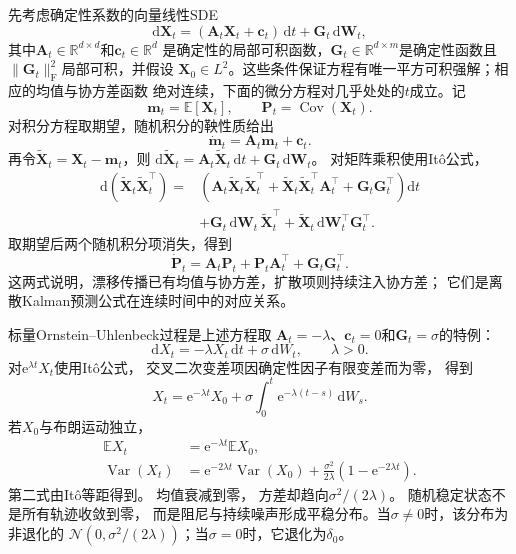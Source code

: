 先考虑确定性系数的向量线性SDE
\[
	\mathrm d\bm X_t
	=(\bm A_t\bm X_t+\bm c_t)\,\mathrm dt
	+\bm G_t\,\mathrm d\bm W_t,
\]
其中$\bm A_t\in\mathbb{R}^{d\times d}$和$\bm c_t\in\mathbb{R}^d$
是确定性的局部可积函数，$\bm G_t\in\mathbb{R}^{d\times m}$是确定性函数且
$\lVert\bm G_t\rVert_{\mathrm F}^2$局部可积，并假设
$\bm X_0\in L^2$。这些条件保证方程有唯一平方可积强解；相应的均值与协方差函数
绝对连续，下面的微分方程对几乎处处的$t$成立。记
\[
	\bm m_t=\mathbb{E}[\bm X_t],\qquad
	\bm P_t=\operatorname{Cov}(\bm X_t).
\]
对积分方程取期望，随机积分的鞅性质给出
\begin{equation}
	\dot{\bm m}_t=\bm A_t\bm m_t+\bm c_t.
	\label{eq:dynamical-linear-sde-mean}
\end{equation}
再令$\widetilde{\bm X}_t=\bm X_t-\bm m_t$，则
$\mathrm d\widetilde{\bm X}_t
=\bm A_t\widetilde{\bm X}_t\,\mathrm dt+\bm G_t\,\mathrm d\bm W_t$。
对矩阵乘积使用Itô公式，
\[
	\begin{aligned}
	\mathrm d(\widetilde{\bm X}_t\widetilde{\bm X}_t^\top)
	={}&
	\left(
	\bm A_t\widetilde{\bm X}_t\widetilde{\bm X}_t^\top
	+\widetilde{\bm X}_t\widetilde{\bm X}_t^\top\bm A_t^\top
	+\bm G_t\bm G_t^\top
	\right)\mathrm dt\\
	&+\bm G_t\,\mathrm d\bm W_t\,\widetilde{\bm X}_t^\top
	+\widetilde{\bm X}_t\,\mathrm d\bm W_t^\top\bm G_t^\top.
	\end{aligned}
\]
取期望后两个随机积分项消失，得到
\begin{equation}
	\dot{\bm P}_t
	=\bm A_t\bm P_t+\bm P_t\bm A_t^\top+\bm G_t\bm G_t^\top.
	\label{eq:dynamical-linear-sde-covariance}
\end{equation}
这两式说明，漂移传播已有均值与协方差，扩散项则持续注入协方差；
它们是离散Kalman预测公式在连续时间中的对应关系。

标量Ornstein--Uhlenbeck过程是上述方程取
$\bm A_t=-\lambda$、$\bm c_t=0$和$\bm G_t=\sigma$的特例：
\begin{equation}
	\mathrm{d}X_{t}= -\lambda X_{t}\,\mathrm{d}t+ \sigma\,\mathrm{d}W_{t}, \qquad \lambda
	>0. \label{eq:dynamical-ou-sde}
\end{equation}
对$\mathrm{e}^{\lambda t}X_{t}$使用Itô公式， 交叉二次变差项因确定性因子有限变差而为零，
得到
\[
	X_{t}= \mathrm{e}^{-\lambda t}X_{0}+ \sigma \int_{0}^{t}\mathrm{e}^{-\lambda(t-s)}
	\,\mathrm{d}W_{s}.
\]
若$X_{0}$与布朗运动独立，
\begin{align}
	\mathbb{E}X_{t}           & = \mathrm{e}^{-\lambda t}\mathbb{E}X_{0}, \label{eq:dynamical-ou-mean}                                                                          \\
	\operatorname{Var}(X_{t}) & = \mathrm{e}^{-2\lambda t}\operatorname{Var}(X_{0}) + \frac{\sigma^{2}}{2\lambda}(1-\mathrm{e}^{-2\lambda t}). \label{eq:dynamical-ou-variance}
\end{align}
第二式由Itô等距得到。 均值衰减到零， 方差却趋向$\sigma^{2}/(2\lambda)$。 随机稳定状态不是所有轨迹收敛到零，
而是阻尼与持续噪声形成平稳分布。当$\sigma\neq0$时，该分布为非退化的
$\mathcal N(0,\sigma^2/(2\lambda))$；当$\sigma=0$时，它退化为$\delta_0$。

